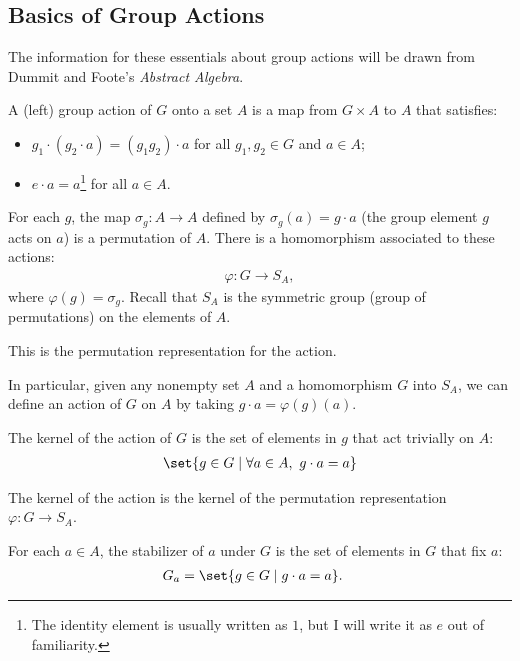 \documentclass[12pt]{mypackage}
\begin{document}
\subsection{Basics of Group Actions}%
The information for these essentials about group actions will be drawn from Dummit and Foote's \textit{Abstract Algebra}.
\begin{definition}
  A (left) group action of $G$ onto a set $A$ is a map from $G\times A$ to $A$ that satisfies:
  \begin{itemize}
    \item $g_1\cdot \left(g_2\cdot a\right) = \left(g_1g_2\right)\cdot a$ for all $g_1,g_2\in G$ and $a\in A$;
    \item $e\cdot a = a$\footnote{The identity element is usually written as $1$, but I will write it as $e$ out of familiarity.} for all $a\in A$.
  \end{itemize}
\end{definition}
\begin{definition}
  For each $g$, the map $\sigma_g: A\rightarrow A$ defined by $\sigma_g(a) = g\cdot a$ (the group element $g$ acts on $a$) is a permutation of $A$. There is a homomorphism associated to these actions:
  \begin{align*}
    \varphi: G\rightarrow S_A,
  \end{align*}
  where $\varphi(g) = \sigma_g$. Recall that $S_A$ is the symmetric group (group of permutations) on the elements of $A$. \newline

  This is the permutation representation for the action.\newline

  In particular, given any nonempty set $A$ and a homomorphism $G$ into $S_A$, we can define an action of $G$ on $A$ by taking $g\cdot a = \varphi(g)(a)$.
\end{definition}
\begin{definition}[Kernel]
  The kernel of the action of $G$ is the set of elements in $g$ that act trivially on $A$:
  \begin{align*}
    \set{g\in G\mid \forall a\in A,~g\cdot a = a}
  \end{align*}
\end{definition}
\begin{note}
  The kernel of the action is the kernel of the permutation representation $\varphi: G\rightarrow S_{A}$.
\end{note}
\begin{definition}[Stabilizer]
  For each $a\in A$, the stabilizer of $a$ under $G$ is the set of elements in $G$ that fix $a$:
  \begin{align*}
    G_a &= \set{g\in G\mid g\cdot a = a}.
  \end{align*}
\end{definition}
\end{document}
